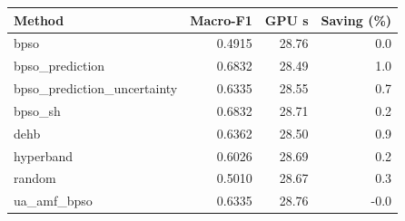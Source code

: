 \begin{tabular}{lrrr}\toprule
Method & Macro-F1 & GPU s & Saving (\%)\\\midrule
bpso & 0.4915 & 28.76 & 0.0\\
bpso\_prediction & 0.6832 & 28.49 & 1.0\\
bpso\_prediction\_uncertainty & 0.6335 & 28.55 & 0.7\\
bpso\_sh & 0.6832 & 28.71 & 0.2\\
dehb & 0.6362 & 28.50 & 0.9\\
hyperband & 0.6026 & 28.69 & 0.2\\
random & 0.5010 & 28.67 & 0.3\\
ua\_amf\_bpso & 0.6335 & 28.76 & -0.0\\
\bottomrule\end{tabular}
